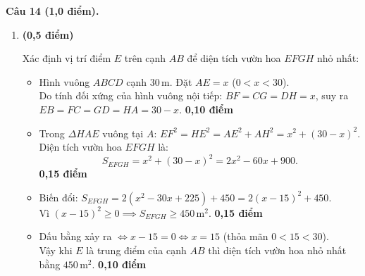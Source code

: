\documentclass[12pt,a4paper]{article}
\begin{document}
\noindent\textbf{Câu 14 (1,0 điểm).}
\begin{enumerate}[label=\alph*), leftmargin=18pt, itemsep=2.5pt, parsep=0pt]
  \item \textbf{(0,5 điểm)}
  \par\noindent
  \begin{minipage}[t]{0.72\linewidth}
    Xác định vị trí điểm $E$ trên cạnh $AB$ để diện tích vườn hoa $EFGH$ nhỏ nhất:
    \begin{itemize}[leftmargin=14pt, itemsep=1.5pt, parsep=0pt]
      \item Hình vuông $ABCD$ cạnh $30\,\text{m}$. Đặt $AE = x$ ($0 < x < 30$).\\
      Do tính đối xứng của hình vuông nội tiếp: $BF = CG = DH = x$, suy ra $EB = FC = GD = HA = 30 - x$. \dotfill \textbf{0,10 điểm}
      \item Trong $\Delta HAE$ vuông tại $A$: $EF^2 = HE^2 = AE^2 + AH^2 = x^2 + (30 - x)^2$.
      Diện tích vườn hoa $EFGH$ là:
      \[
        S_{EFGH} = x^2 + (30 - x)^2 = 2x^2 - 60x + 900.
      \] \dotfill \textbf{0,15 điểm}
      \item Biến đổi: $S_{EFGH} = 2(x^2 - 30x + 225) + 450 = 2(x - 15)^2 + 450$.\\
      Vì $(x - 15)^2 \ge 0 \implies S_{EFGH} \ge 450\,\text{m}^2$. \dotfill \textbf{0,15 điểm}
      \item Dấu bằng xảy ra $\iff x - 15 = 0 \iff x = 15$ (thỏa mãn $0 < 15 < 30$).\\
      Vậy khi $E$ là trung điểm của cạnh $AB$ thì diện tích vườn hoa nhỏ nhất bằng $450\,\text{m}^2$. \dotfill \textbf{0,10 điểm}
    \end{itemize}
  \end{minipage}\hfill
  \begin{minipage}[t]{0.26\linewidth}
    \vspace{-2mm}
    \centering
\end{minipage}
\end{enumerate}
\end{document}
